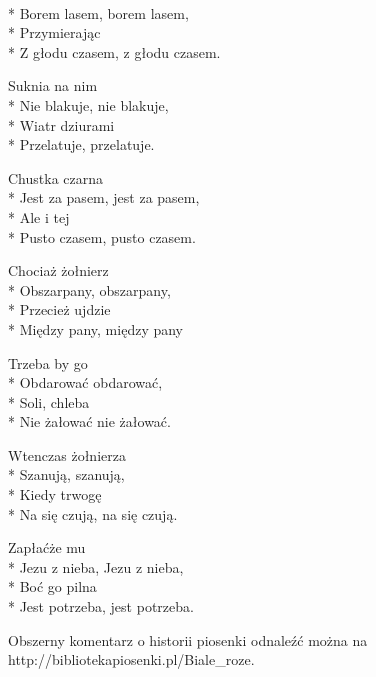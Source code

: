 \begin{lyrics}[longestline={Z głodu czasem, z głodu czasem}]

\\*
Borem lasem, borem lasem,\\*
Przymierając\\*
Z głodu czasem, z głodu czasem.

Suknia na nim\\*
Nie blakuje, nie blakuje,\\*
Wiatr dziurami\\*
Przelatuje, przelatuje.

Chustka czarna\\*
Jest za pasem, jest za pasem,\\*
Ale i tej\\*
Pusto czasem, pusto czasem.

Chociaż żołnierz\\*
Obszarpany, obszarpany,\\*
Przecież ujdzie\\*
Między pany, między pany

Trzeba by go\\*
Obdarować obdarować,\\*
Soli, chleba\\*
Nie żałować nie żałować.

Wtenczas żołnierza\\*
Szanują, szanują,\\*
Kiedy trwogę\\*
Na się czują, na się czują.

Zapłaćże mu\\*
Jezu z nieba, Jezu z nieba,\\*
Boć go pilna\\*
Jest potrzeba, jest potrzeba.
\end{lyrics}



\begin{info}Obszerny komentarz o historii piosenki odnaleźć można na http://bibliotekapiosenki.pl/Biale_roze.\end{info}

